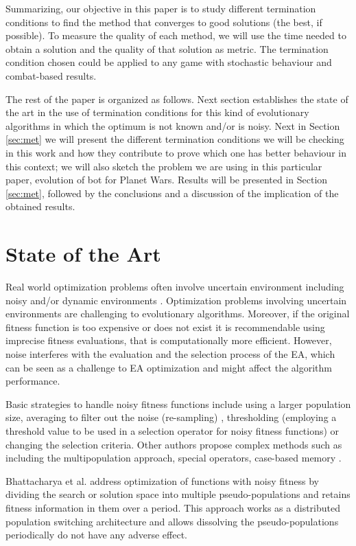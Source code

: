 \documentclass[runningheads,a4paper]{llncs}
\begin{document}
Summarizing, our objective in this paper is to study different 
termination conditions to find the method that converges to good 
solutions (the best, if possible). To measure the quality of each 
method, we will use the time needed to obtain a solution and the
 quality of that solution as metric. The termination condition chosen could be applied to any game with
stochastic behaviour and combat-based results.

The rest of the paper is organized as follows. Next section
establishes the state of the art in the use of termination conditions
for this kind of evolutionary algorithms in which the optimum is not
known and/or is noisy. Next in Section \ref{sec:met} we will present the different termination
conditions we will be checking in this work and how they contribute to
prove which one has better behaviour in this context; we will also
sketch the problem we are using in this particular paper, evolution of
bot for Planet Wars. Results will be presented in Section
\ref{sec:met}, followed by the conclusions and a discussion of the
implication of the obtained results.

\section{State of the Art}

Real world optimization problems often involve uncertain environment including noisy and/or dynamic environments \cite{Jin2005303,QianYZ13}.
Optimization problems involving uncertain environments are challenging to evolutionary algorithms. 
Moreover, if the original fitness function is too expensive or does not exist it is recommendable using imprecise fitness evaluations, that is computationally more efficient.
However, noise interferes with the evaluation and the selection process of the EA, which can be seen as a challenge to EA optimization and might affect the algorithm performance.

Basic strategies to handle noisy fitness functions include using a larger population size, averaging to filter out the noise (re-sampling) \cite{Branke98,Branke2001}, thresholding (employing a threshold value to be used in a selection operator for noisy fitness functions) \cite{Markon2001} or changing the selection criteria.
Other authors propose complex methods such as including the multipopulation approach, special operators, case-based memory \cite{BhattacharyaIM14}. 

Bhattacharya et al. \cite{BhattacharyaIM14} address optimization of functions with noisy fitness by dividing the search or solution space into multiple pseudo-populations and retains fitness information in them over a period. This approach works as a distributed population switching architecture and allows dissolving the pseudo-populations periodically do not have any adverse effect.
\end{document}
